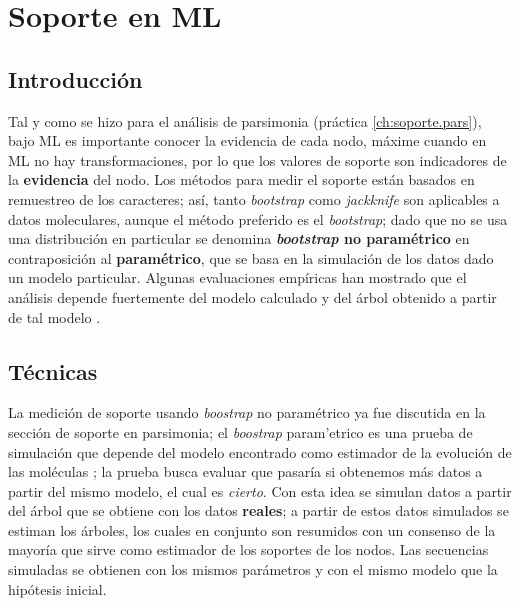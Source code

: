\chapter{Soporte en ML}
\section*{Introducci\'on}


Tal y como se hizo para el an\'alisis de parsimonia (pr\'actica \ref{ch:soporte.pars}), bajo ML es importante conocer la evidencia de cada nodo, m\'axime cuando en ML no hay transformaciones, por lo que los valores de soporte son indicadores de la \textbf{evidencia} del nodo. Los m\'etodos para medir el soporte est\'an basados en remuestreo de los caracteres; as\'i, tanto \textit{bootstrap} 
 como \textit{jackknife} 
 son aplicables a datos moleculares, aunque el m\'etodo preferido es el \textit{bootstrap}; dado que no se usa una distribuci\'on en particular se denomina \textbf{\textit{bootstrap} no param\'etrico} en contraposici\'on al \textbf{param\'etrico}, que se basa en la simulaci\'on de los datos dado un modelo particular. Algunas evaluaciones emp\'iricas han mostrado que el an\'alisis depende fuertemente del modelo calculado y del \'arbol obtenido a partir de tal modelo \citep{Felsenstein2004,Antezana2003}.


\section*{T\'ecnicas}
La medici\'on de soporte usando \textit{boostrap} no param\'etrico ya fue discutida en la secci\'on de soporte en parsimonia; el \textit{boostrap} param'etrico es una prueba de simulaci\'on que depende del modelo encontrado como estimador de la evoluci\'on de las mol\'eculas \citep{Felsenstein2004}; la prueba busca evaluar que pasar\'ia si obtenemos m\'as datos a partir del mismo modelo, el cual es \textit{cierto}. Con esta idea se simulan datos a partir del \'arbol que se obtiene con los datos \textbf{reales}; a partir de estos datos simulados se estiman los \'arboles, los cuales en conjunto son resumidos con un consenso de la mayor\'ia que sirve como estimador de los soportes de los nodos. Las secuencias simuladas se obtienen con los mismos par\'ametros y con el mismo modelo que la hip\'otesis inicial.



